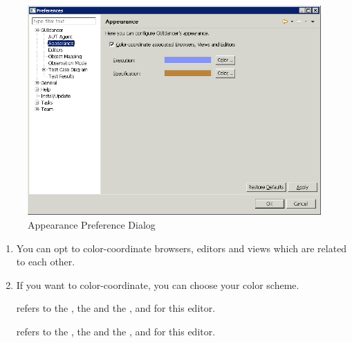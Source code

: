 \label{appearanceprefs}



\begin{figure}[h]
\begin{center}
\includegraphics[width=12.5cm]{Tasks/Preferences/PS/appearanceprefs}
\caption{Appearance Preference Dialog}
\label{appearanceprefs}
\end{center}
\end{figure}

\begin{enumerate}
\item You can opt to color-coordinate browsers, editors and views which are related to each other. 
\item If you want to color-coordinate, you can choose your color scheme. 

 refers to the \gdtestsuitebrowser{}, the \gdtestsuiteeditor{} and the \gdpropview{}, \gdcompnamesview{} and \gddatasetsview{} for this editor. 

 refers to the \gdtestcasebrowser{}, the \gdtestcaseeditor{} and the \gdpropview{}, \gdcompnamesview{} and \gddatasetsview{} for this editor. 
\end{enumerate}






